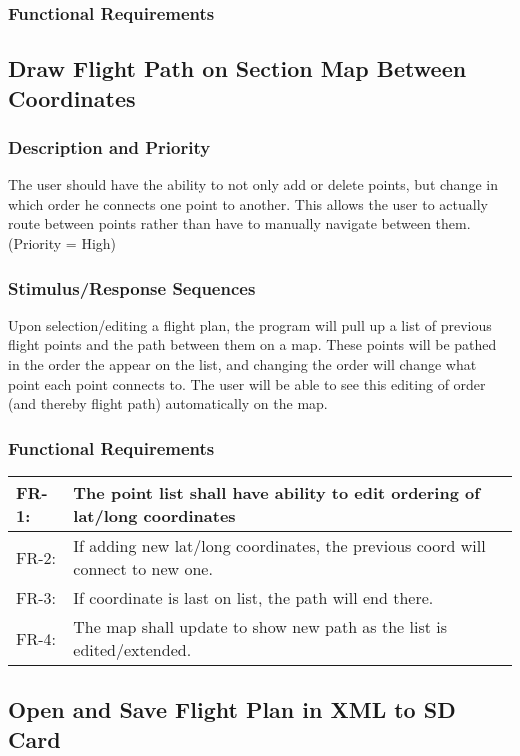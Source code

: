 \documentclass[12pt, letterpaper]{article}
\begin{document}
      \subsubsection{Functional Requirements}

      \subsection{Draw Flight Path on Section Map Between Coordinates}
        \subsubsection{Description and Priority}
        		The user should have the ability to not only add or delete points, but change in which
        		order he connects one point to another. This allows the user to actually route between 
        		points rather than have to manually navigate between them. (Priority = High)
        \subsubsection{Stimulus/Response Sequences}
            Upon selection/editing a flight plan, the program will pull up a list of previous flight
            points and the path between them on a map. These points will be pathed in the order the
            appear on the list, and changing the order will change what point each point connects to.
            The user will be able to see this editing of order (and thereby flight path) automatically
            on the map.
        \subsubsection{Functional Requirements}
          \begin{tabularx}{\textwidth}{|l|X|} \hline
            FR-1: & The point list shall have ability to edit ordering of lat/long coordinates\\ \hline
            FR-2: & If adding new lat/long coordinates, the previous coord will connect to new one.\\ \hline
            FR-3: & If coordinate is last on list, the path will end there.\\ \hline
      	    FR-4: & The map shall update to show new path as the list is edited/extended.\\ \hline
          \end{tabularx}
        \subsection{Open and Save Flight Plan in XML to SD Card}
\end{document}
